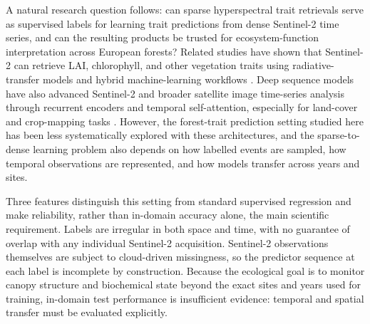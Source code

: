 \documentclass[final,times,onecolumn, authoryear]{elsarticle}
\begin{document}
\begin{linenumbers}
A natural research question follows: can sparse hyperspectral trait retrievals serve as supervised labels for learning trait predictions from dense Sentinel-2 time series, and can the resulting products be trusted for ecosystem-function interpretation across European forests? Related studies have shown that Sentinel-2 can retrieve LAI, chlorophyll, and other vegetation traits using radiative-transfer models and hybrid machine-learning workflows \citep{brown2019sentinel2, estevez2020gpr, estevez2021traits}. Deep sequence models have also advanced Sentinel-2 and broader satellite image time-series analysis through recurrent encoders and temporal self-attention, especially for land-cover and crop-mapping tasks \citep{russwurm2018multi, garnot2020sits}. However, the forest-trait prediction setting studied here has been less systematically explored with these architectures, and the sparse-to-dense learning problem also depends on how labelled events are sampled, how temporal observations are represented, and how models transfer across years and sites.

Three features distinguish this setting from standard supervised regression and make reliability, rather than in-domain accuracy alone, the main scientific requirement. Labels are irregular in both space and time, with no guarantee of overlap with any individual Sentinel-2 acquisition. Sentinel-2 observations themselves are subject to cloud-driven missingness, so the predictor sequence at each label is incomplete by construction. Because the ecological goal is to monitor canopy structure and biochemical state beyond the exact sites and years used for training, in-domain test performance is insufficient evidence: temporal and spatial transfer must be evaluated explicitly.


\end{linenumbers}
\end{document}
